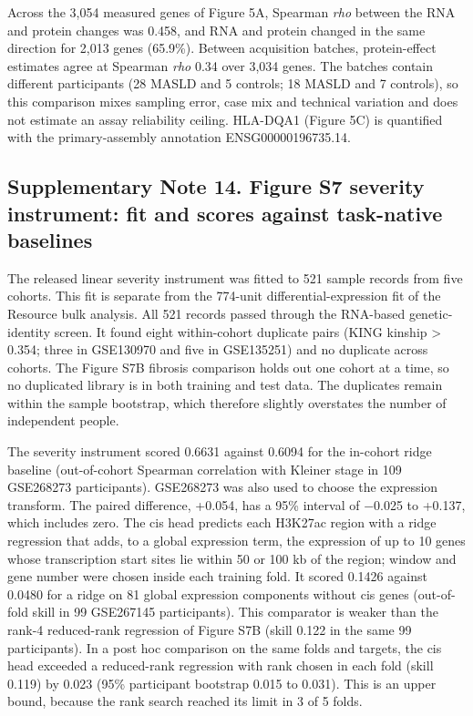 Across the 3,054 measured genes of Figure 5A, Spearman \emph{rho} between the RNA and protein changes was 0.458, and RNA and protein changed in the same direction for 2,013 genes (65.9\%). Between acquisition batches, protein-effect estimates agree at Spearman \emph{rho} 0.34 over 3,034 genes. The batches contain different participants (28 MASLD and 5 controls; 18 MASLD and 7 controls), so this comparison mixes sampling error, case mix and technical variation and does not estimate an assay reliability ceiling. HLA-DQA1 (Figure 5C) is quantified with the primary-assembly annotation ENSG00000196735.14.

\subsection{Supplementary Note 14. Figure S7 severity instrument: fit and scores against task-native baselines}\label{supplementary-note-14.-figure-7-severity-instrument-fit-and-scores-against-task-native-baselines}

The released linear severity instrument was fitted to 521 sample records from five cohorts. This fit is separate from the 774-unit differential-expression fit of the Resource bulk analysis. All 521 records passed through the RNA-based genetic-identity screen. It found eight within-cohort duplicate pairs (KING kinship \textgreater{} 0.354; three in GSE130970 and five in GSE135251) and no duplicate across cohorts. The Figure S7B fibrosis comparison holds out one cohort at a time, so no duplicated library is in both training and test data. The duplicates remain within the sample bootstrap, which therefore slightly overstates the number of independent people.

The severity instrument scored 0.6631 against 0.6094 for the in-cohort ridge baseline (out-of-cohort Spearman correlation with Kleiner stage in 109 GSE268273 participants). GSE268273 was also used to choose the expression transform. The paired difference, +0.054, has a 95\% interval of −0.025 to +0.137, which includes zero. The cis head predicts each H3K27ac region with a ridge regression that adds, to a global expression term, the expression of up to 10 genes whose transcription start sites lie within 50 or 100 kb of the region; window and gene number were chosen inside each training fold. It scored 0.1426 against 0.0480 for a ridge on 81 global expression components without cis genes (out-of-fold skill in 99 GSE267145 participants). This comparator is weaker than the rank-4 reduced-rank regression of Figure S7B (skill 0.122 in the same 99 participants). In a post hoc comparison on the same folds and targets, the cis head exceeded a reduced-rank regression with rank chosen in each fold (skill 0.119) by 0.023 (95\% participant bootstrap 0.015 to 0.031). This is an upper bound, because the rank search reached its limit in 3 of 5 folds.

